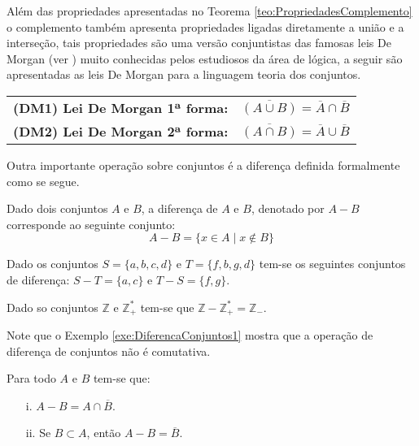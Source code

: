 Além das propriedades apresentadas no Teorema \ref{teo:PropriedadesComplemento} o complemento também apresenta propriedades ligadas diretamente a união e a interseção, tais propriedades são uma versão conjuntistas das famosas leis De Morgan (ver \cite{carmo2013, joaoPavao2014, lipschutz2013-MD}) muito conhecidas pelos estudiosos da área de lógica, a seguir são apresentadas as leis De Morgan para a linguagem teoria dos conjuntos.

\begin{table*}[h]
	\centering
	\begin{tabular}{lc}
		\textbf{(DM1) Lei De Morgan 1ª forma:} & $\overline{(A \cup B)} = \overline{A} \cap \overline{B}$\\
		\textbf{(DM2) Lei De Morgan 2ª forma:} & $\overline{(A \cap B)} = \overline{A} \cup \overline{B}$\\
	\end{tabular}
\end{table*}

Outra importante operação sobre conjuntos é a diferença definida formalmente como se segue.

\begin{definition}\label{def:DiferencaConjuntos}
	Dado dois conjuntos $A$ e $B$, a diferença de $A$ e $B$, denotado por $A - B$ corresponde ao seguinte conjunto:
	$$A - B = \{x \in A \mid x \notin B\}$$
\end{definition}

\begin{example}\label{exe:DiferencaConjuntos1}
	Dado os conjuntos $S = \{a, b, c, d\}$ e $T = \{f, b, g, d\}$ tem-se os seguintes conjuntos de diferença: $S - T = \{a, c\}$ e $T - S = \{f, g\}$.
\end{example}

\begin{example}\label{exe:DiferencaConjuntos2}
	Dado so conjuntos $\mathbb{Z}$ e $\mathbb{Z}_+^*$ tem-se que $\mathbb{Z} - \mathbb{Z}_+^* = \mathbb{Z}_-$.
\end{example}

\begin{remark}
	Note que o Exemplo \ref{exe:DiferencaConjuntos1} mostra que a operação de diferença de conjuntos não é comutativa.
\end{remark}

\begin{theorem}\label{teo:BasicoDiferencaConjuntos}
	Para todo $A$ e $B$ tem-se que:
	\begin{itemize}
		\item[i.] $A - B = A \cap \overline{B}$.
		\item[ii.] Se $B \subset A$, então $A - B = \overline{B}$.
	\end{itemize}
\end{theorem}


